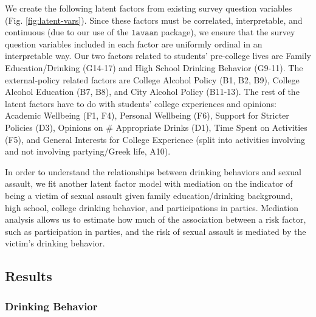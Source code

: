 \documentclass[]{article}
\begin{document}
We create the following latent factors from existing survey question
variables (Fig. \ref{fig:latent-vars}). Since these factors must be
correlated, interpretable, and continuous (due to our use of the
\(\texttt{lavaan}\) package), we ensure that the survey question
variables included in each factor are uniformly ordinal in an
interpretable way. Our two factors related to students' pre-college
lives are Family Education/Drinking (G14-17) and High School Drinking
Behavior (G9-11). The external-policy related factors are College
Alcohol Policy (B1, B2, B9), College Alcohol Education (B7, B8), and
City Alcohol Policy (B11-13). The rest of the latent factors have to do
with students' college experiences and opinions: Academic Wellbeing (F1,
F4), Personal Wellbeing (F6), Support for Stricter Policies (D3),
Opinions on \# Appropriate Drinks (D1), Time Spent on Activities (F5),
and General Interests for College Experience (split into activities
involving and not involving partying/Greek life, A10).

In order to understand the relationships between drinking behaviors and
sexual assault, we fit another latent factor model with mediation on the
indicator of being a victim of sexual assault given family
education/drinking background, high school, college drinking behavior,
and participations in parties. Mediation analysis allows us to estimate
how much of the association between a risk factor, such as participation
in parties, and the risk of sexual assault is mediated by the victim's
drinking behavior.

\hypertarget{results}{%
\subsection{Results}\label{results}}

\hypertarget{drinking-behavior}{%
\subsubsection{Drinking Behavior}\label{drinking-behavior}}
\end{document}
